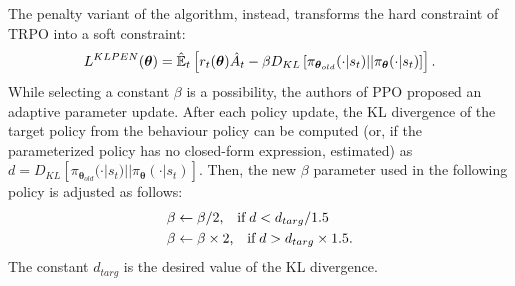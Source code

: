 The penalty variant of the algorithm, instead, transforms the hard constraint of \ac{TRPO} into a soft constraint:
%
\begin{equation*}
    L^{KLPEN}(\boldsymbol{\theta}) = \hat{\operatorname*{\mathbb{E}}}_t \left[ r_t(\boldsymbol{\theta}) \hat{A}_t - \beta D_{KL}\left[\pi_{\boldsymbol{\theta}_{old}}(\cdot|s_t) || \pi_{\boldsymbol{\theta}}(\cdot|s_t)\right] \right] .
\end{equation*}
%
While selecting a constant $\beta$ is a possibility, the authors of \ac{PPO} proposed an adaptive parameter update.
After each policy update, the \ac{KL} divergence of the target policy from the behaviour policy can be computed (or, if the parameterized policy has no closed-form expression, estimated) as $d = D_{KL}\left[\pi_{\boldsymbol{\theta}_{old}}(\cdot|s_t) || \pi_{\boldsymbol{\theta}}(\cdot|s_t)\right]$.
Then, the new $\beta$ parameter used in the following policy is adjusted as follows:
%
\begin{align*}
    &\beta \leftarrow \beta / 2 \text{,\quad if\;} d < d_{targ} / 1.5 \\
    &\beta \leftarrow \beta \times 2 \text{,\quad if\;} d > d_{targ} \times 1.5 .
\end{align*}
%
The constant $d_{targ}$ is the desired value of the \ac{KL} divergence.
